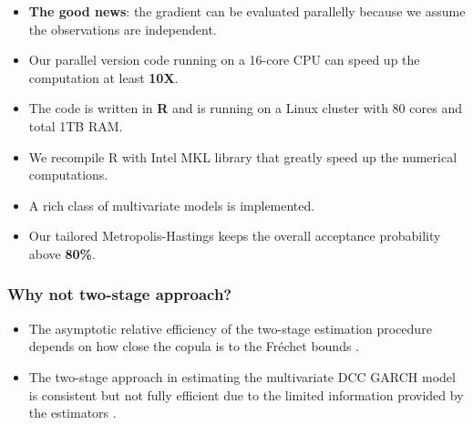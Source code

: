 \documentclass{beamer}
\begin{document}
\begin{frame}[allowframebreaks]
\begin{itemize}
\begin{itemize}
    \end{itemize}

  \item \textbf{The good news}: the gradient can be evaluated parallelly because we assume
    the observations are independent.

  \item Our parallel version code running on a 16-core CPU can speed up the
    computation at least \textbf{10X}.


  \item The code is written in \textbf{R} and is running on a Linux cluster with 80 cores
    and total 1TB RAM.

  \item We recompile R with Intel MKL library that greatly speed up the numerical
    computations.

  \item A rich class of multivariate models is implemented.

  \item Our tailored Metropolis-Hastings keeps the overall acceptance probability above
    \textbf{80\%}.
  \end{itemize}
\end{frame}

\begin{frame}
  \frametitle{Why not two-stage approach?}
  \begin{itemize}
  \item The asymptotic relative efficiency of the two-stage estimation procedure depends
    on how close the copula is to the Fr\'echet bounds
    {\color{blue}\citep{joe2005asymptotic}}.
  \item The two-stage approach in estimating the multivariate DCC GARCH model is
    consistent but not fully efficient due to the limited information provided by the
    estimators {\color{blue}\citep{engle2001theoretical}}.
  \end{itemize}
\end{frame}
\end{document}
